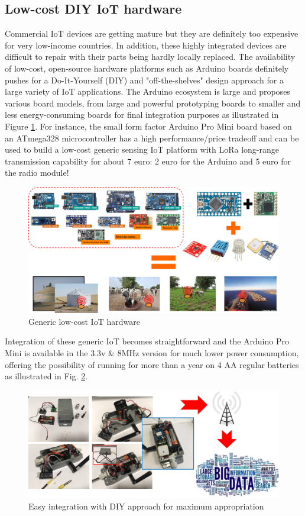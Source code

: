 \subsection{Low-cost DIY IoT hardware}

Commercial IoT devices are getting mature but they are definitely too expensive for very low-income countries. In addition, these highly integrated devices are difficult to repair with their parts being hardly locally replaced.  The availability of low-cost, open-source hardware platforms such as Arduino boards definitely pushes for a Do-It-Yourself (DIY) and "off-the-shelves" design approach for a large variety of IoT applications. The Arduino ecosystem is large and proposes various board models, from large and powerful prototyping boards to smaller and less energy-consuming boards for final integration purposes as illustrated in Figure \ref{figure-generic-iot}. For instance, the small form factor Arduino Pro Mini board based on an ATmega328 microcontroller has a high performance/price tradeoff and can be used to build a low-cost generic sensing IoT platform with LoRa long-range transmission capability for about 7 euro: 2 euro for the Arduino and 5 euro for the radio module!

\begin{figure}  
\centering  
\includegraphics[width=.75\linewidth]{figures/generic-iot}   
\caption{Generic low-cost IoT hardware}   
\label{figure-generic-iot}  
\end{figure} 

Integration of these generic IoT becomes straightforward and the Arduino Pro Mini is available in the 3.3v \& 8MHz version for much lower power consumption, offering the possibility of running for more than a year on 4 AA regular batteries as illustrated in Fig. \ref{figure-easy-integration}. 

\begin{figure} 
\centering  
\includegraphics[width=.8\linewidth]{figures/easy-integration}   
\caption{Easy integration with DIY approach for maximum appropriation}   
\label{figure-easy-integration}  
\end{figure} 

